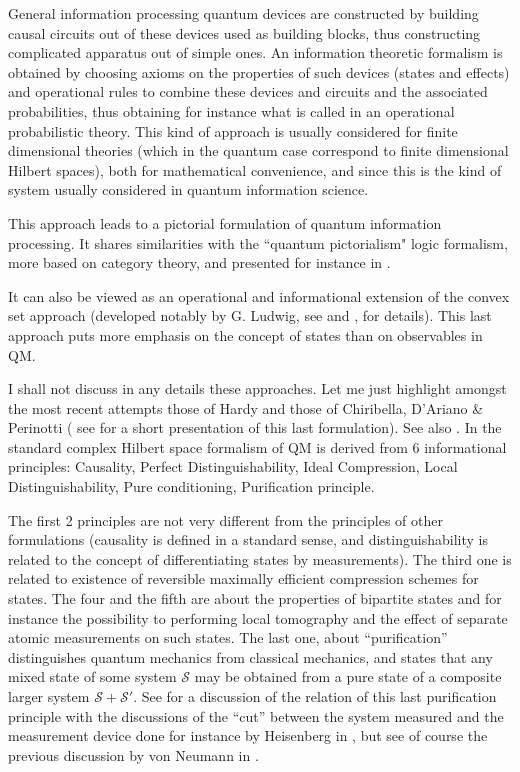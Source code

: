 General information processing quantum devices are constructed by building causal circuits out of these devices used as building blocks, thus constructing complicated apparatus out of simple ones.
An information theoretic formalism is obtained by choosing axioms on the properties of such devices (states and effects) and  operational rules to combine these devices and circuits and the associated probabilities, thus obtaining for  instance what is called in \cite{PhysRevA.84.012311} an operational probabilistic theory.
This kind of approach is usually considered for finite dimensional theories (which in the quantum case correspond to finite dimensional Hilbert spaces), both for mathematical convenience, and since this is the kind of system usually considered in quantum information science.

This approach  leads to a pictorial formulation of quantum information processing. It shares similarities with the ``quantum pictorialism" logic formalism, more based on category theory, and presented for instance in
\cite{Coecke-2010}.

It can also be viewed as an operational and informational extension of the convex set approach (developed notably by G. Ludwig, see
\cite{Ludwig:1985uq} and  \cite{Auletta},\cite{BeltCassi81} for details). This last approach puts more emphasis on the concept of states than on observables in QM.

I shall not discuss in any details these approaches. 
Let me just highlight amongst  the most recent attempts those of Hardy \cite{Hardy-2001,Hardy-2011} and those of Chiribella, D'Ariano \& Perinotti  
\cite{PhysRevA.81.062348, PhysRevA.84.012311} (
see \cite{Physics.4.55} for a short presentation of this last formulation).
See also \cite{MasMue2011}.
In \cite{PhysRevA.84.012311} the standard complex Hilbert space formalism of QM is derived from 6 informational principles: 
Causality,
Perfect Distinguishability,
Ideal Compression,
Local Distinguishability,
Pure conditioning,
Purification principle.

The first 2 principles are not very different from the principles of other formulations (causality is defined in a standard sense, and distinguishability is related to the concept of differentiating states by measurements).
The third one is related to existence of reversible maximally efficient compression schemes for states. 
The four and the fifth are about the properties of bipartite states and for instance the possibility to performing local tomography and the effect of separate atomic measurements on such states.
The last one, about ``purification'' distinguishes quantum mechanics from classical mechanics, and states that any mixed state of some system $\mathcal{S}$ may be obtained from a pure state of a composite larger system $\mathcal{S}+\mathcal{S}'$.
See \cite{Physics.4.55} for a discussion of the relation of this last purification principle with the discussions of the ``cut'' between the system measured and the measurement device done for instance by Heisenberg in \cite{pittphilsci8590}, but see of course the previous discussion by von Neumann in \cite{vonNeumann32G}.

